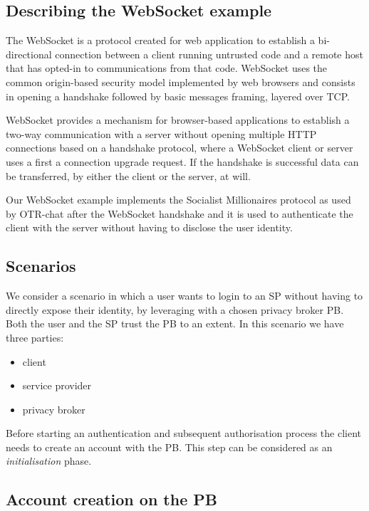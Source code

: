 \subsection{Describing the WebSocket example}

The WebSocket is a protocol created for web application to establish a bi-directional connection between a client running untrusted code and a remote host that has opted-in to communications from that code. 
WebSocket uses the common origin-based security model implemented by web browsers and consists in opening a handshake followed by basic messages framing, layered over TCP.

WebSocket provides a mechanism for browser-based applications to establish a two-way communication with a server without opening multiple HTTP connections based on a handshake protocol, where a WebSocket client or server uses a first a connection upgrade request. If the handshake is successful data can be transferred, by either the client or the server, at will.

Our WebSocket example implements the Socialist Millionaires protocol as used by OTR-chat after the WebSocket handshake and it is used to authenticate the client with the server without having to disclose the user identity.

\subsection{Scenarios}

We consider a scenario in which a user wants to login to an SP without having to directly expose their identity, by leveraging with a chosen privacy broker PB. Both the user and the SP trust the PB to an extent. In this scenario we have three parties:
\begin{itemize}
    \item client
    \item service provider
    \item privacy broker
\end{itemize}

Before starting an authentication and subsequent authorisation process the client needs to create an account with the PB. This step can be considered as an \emph{initialisation} phase.

\subsection{Account creation on the PB}


